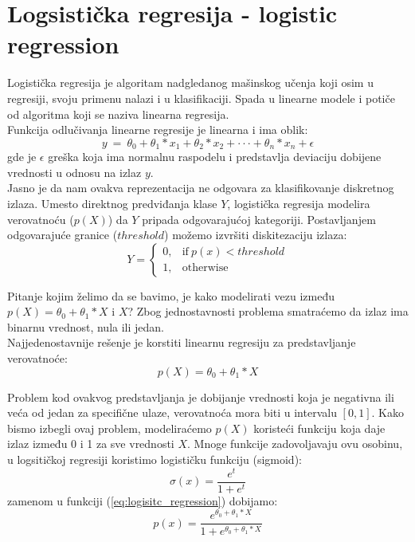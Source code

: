 \section{Logsistička regresija - logistic regression}
Logistička regresija je algoritam nadgledanog mašinskog učenja koji osim u
regresiji, svoju primenu nalazi i u klasifikaciji. Spada u linearne modele i
potiče od algoritma koji se naziva linearna regresija. \\

Funkcija odlučivanja linearne regresije je linearna i ima oblik:
\begin{equation}
  y \ = \ \theta_0 + \theta_1 * x_1 + \theta_2 * x_2 + \cdot\cdot\cdot + \theta_n * x_n + \epsilon
\end{equation}
gde je $\epsilon$ greška koja ima normalnu raspodelu i predstavlja deviaciju
dobijene vrednosti u odnosu na izlaz $y$. \\

Jasno je da nam ovakva reprezentacija ne odgovara za klasifikovanje diskretnog
izlaza. Umesto direktnog predviđanja klase $Y$, logistička regresija modelira
verovatnoću ($p\left(X\right)$) da $Y$ pripada odgovarajućoj kategoriji.
Postavljanjem odgovarajuće granice ($threshold$) možemo izvršiti diskitezaciju
izlaza:
\begin{equation}
  Y =
    \begin{cases}
      0, & \text{if}\ p\left(x\right) < threshold \\
      1, & \text{otherwise}\
    \end{cases}
\end{equation}

Pitanje kojim želimo da se bavimo, je kako modelirati vezu između
$p\left(X\right) = \theta_0 + \theta_1 * X$ i $X$? Zbog jednostavnosti problema
smatraćemo da izlaz ima binarnu vrednost, nula ili jedan. \\

Najjedenostavnije rešenje je korstiti linearnu
regresiju za predstavljanje verovatnoće:
\begin{equation} \label{eq:logisitc_regression}
  p\left(X\right) = \theta_0 + \theta_1*X
\end{equation}

Problem kod ovakvog predstavljanja je dobijanje vrednosti koja je negativna ili
veća od jedan za specifične ulaze, verovatnoća mora biti u intervalu $[0, 1]$.
Kako bismo izbegli ovaj problem, modeliraćemo $p\left(X\right)$ koristeći
funkciju koja daje izlaz između 0 i 1 za sve vrednosti $X$. Mnoge funkcije
zadovoljavaju ovu osobinu, u logsitičkoj regresiji koristimo logističku funkciju
(sigmoid):
\begin{equation}
  \sigma\left(x\right)=\frac{e^{t}}{1+e^{t}}
\end{equation}
zamenom u funkciji (\ref{eq:logisitc_regression}) dobijamo:
\begin{equation} \label{eq:p_x_logit}
  p\left(x\right) = \frac{e^{\theta_0 + \theta_1 * X}}{1 + e^{\theta_0 + \theta_1 * X}}
\end{equation}

